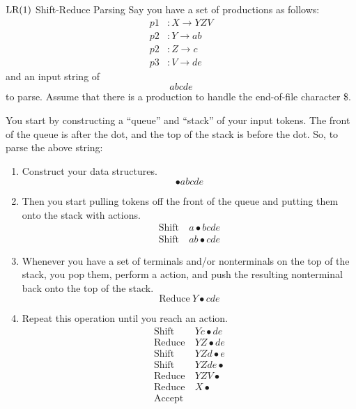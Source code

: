 \begin{example}[]{\texorpdfstring{$\operatorname{\text{LR}}(1)$}{$LR(1)$} Shift-Reduce Parsing}
  Say you have a set of productions as follows:
  \begin{align*}
    p1&: X \rightarrow YZV \\
    p2&: Y \rightarrow ab \\
    p2&: Z \rightarrow c \\
    p3&: V \rightarrow de
  \end{align*}
  and an input string of
  \begin{equation*}
    abcde
  \end{equation*}
  to parse.
  Assume that there is a production to handle the end-of-file character \$.

  \tcblower

  You start by constructing a ``queue'' and ``stack'' of your input tokens.
  The front of the queue is after the dot, and the top of the stack is before the dot.
  So, to parse the above string:
  \begin{enumerate}[noitemsep]
  \item Construct your data structures.
    \begin{equation*}
      \bullet abcde
    \end{equation*}
  \item Then you start pulling tokens off the front of the queue and putting them onto the stack with  actions.
    \begin{align*}
      \text{Shift}& \: a \bullet bcde \\
      \text{Shift}& \: ab \bullet cde
    \end{align*}
  \item Whenever you have a set of terminals and/or nonterminals on the top of the stack, you pop them, perform a  action, and push the resulting nonterminal back onto the top of the stack.
    \begin{equation*}
      \text{Reduce} \: Y \bullet cde
    \end{equation*}
  \item Repeat this operation until you reach an  action.
    \begin{align*}
      \text{Shift}& \: Yc \bullet de \\
      \text{Reduce}& \: YZ \bullet de \\
      \text{Shift}& \: YZd \bullet e \\
      \text{Shift}& \: YZde \bullet \\
      \text{Reduce}& \: YZV \bullet \\
      \text{Reduce}& \: X \bullet \\
      \text{Accept}&
    \end{align*}
  \end{enumerate}
\end{example}

